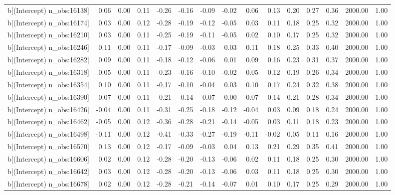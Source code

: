 \begin{table}[ht]
\begin{tabular}{rrrrrrrrrrrrrrr}
  b[(Intercept) n\_obs:16138] & 0.06 & 0.00 & 0.11 & -0.26 & -0.16 & -0.09 & -0.02 & 0.06 & 0.13 & 0.20 & 0.27 & 0.36 & 2000.00 & 1.00 \\ 
  b[(Intercept) n\_obs:16174] & 0.03 & 0.00 & 0.12 & -0.28 & -0.19 & -0.12 & -0.05 & 0.03 & 0.11 & 0.18 & 0.25 & 0.32 & 2000.00 & 1.00 \\ 
  b[(Intercept) n\_obs:16210] & 0.03 & 0.00 & 0.11 & -0.25 & -0.19 & -0.11 & -0.05 & 0.02 & 0.10 & 0.17 & 0.25 & 0.32 & 2000.00 & 1.00 \\ 
  b[(Intercept) n\_obs:16246] & 0.11 & 0.00 & 0.11 & -0.17 & -0.09 & -0.03 & 0.03 & 0.11 & 0.18 & 0.25 & 0.33 & 0.40 & 2000.00 & 1.00 \\ 
  b[(Intercept) n\_obs:16282] & 0.09 & 0.00 & 0.11 & -0.18 & -0.12 & -0.06 & 0.01 & 0.09 & 0.16 & 0.23 & 0.31 & 0.37 & 2000.00 & 1.00 \\ 
  b[(Intercept) n\_obs:16318] & 0.05 & 0.00 & 0.11 & -0.23 & -0.16 & -0.10 & -0.02 & 0.05 & 0.12 & 0.19 & 0.26 & 0.34 & 2000.00 & 1.00 \\ 
  b[(Intercept) n\_obs:16354] & 0.10 & 0.00 & 0.11 & -0.17 & -0.10 & -0.04 & 0.03 & 0.10 & 0.17 & 0.24 & 0.32 & 0.38 & 2000.00 & 1.00 \\ 
  b[(Intercept) n\_obs:16390] & 0.07 & 0.00 & 0.11 & -0.21 & -0.14 & -0.07 & -0.00 & 0.07 & 0.14 & 0.21 & 0.28 & 0.34 & 2000.00 & 1.00 \\ 
  b[(Intercept) n\_obs:16426] & -0.04 & 0.00 & 0.11 & -0.31 & -0.25 & -0.18 & -0.12 & -0.04 & 0.03 & 0.09 & 0.18 & 0.24 & 2000.00 & 1.00 \\ 
  b[(Intercept) n\_obs:16462] & -0.05 & 0.00 & 0.12 & -0.36 & -0.28 & -0.21 & -0.14 & -0.05 & 0.03 & 0.11 & 0.18 & 0.23 & 2000.00 & 1.00 \\ 
  b[(Intercept) n\_obs:16498] & -0.11 & 0.00 & 0.12 & -0.41 & -0.33 & -0.27 & -0.19 & -0.11 & -0.02 & 0.05 & 0.11 & 0.16 & 2000.00 & 1.00 \\ 
  b[(Intercept) n\_obs:16570] & 0.13 & 0.00 & 0.12 & -0.17 & -0.09 & -0.03 & 0.04 & 0.13 & 0.21 & 0.29 & 0.35 & 0.41 & 2000.00 & 1.00 \\ 
  b[(Intercept) n\_obs:16606] & 0.02 & 0.00 & 0.12 & -0.28 & -0.20 & -0.13 & -0.06 & 0.02 & 0.11 & 0.18 & 0.25 & 0.30 & 2000.00 & 1.00 \\ 
  b[(Intercept) n\_obs:16642] & 0.03 & 0.00 & 0.12 & -0.28 & -0.20 & -0.13 & -0.06 & 0.03 & 0.11 & 0.18 & 0.25 & 0.30 & 2000.00 & 1.00 \\ 
  b[(Intercept) n\_obs:16678] & 0.02 & 0.00 & 0.12 & -0.28 & -0.21 & -0.14 & -0.07 & 0.01 & 0.10 & 0.17 & 0.25 & 0.29 & 2000.00 & 1.00 \\ 

\end{tabular}
\end{table}
